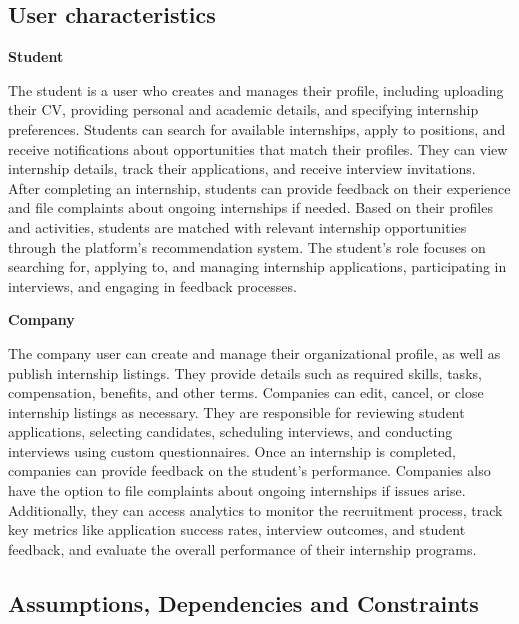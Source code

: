 \subsection{User characteristics}

\textbf{Student}

The student is a user who creates and manages their profile, including uploading their CV, providing personal and academic details, and specifying internship preferences. Students can search for available internships, apply to positions, and receive notifications about opportunities that match their profiles. They can view internship details, track their applications, and receive interview invitations. After completing an internship, students can provide feedback on their experience and file complaints about ongoing internships if needed. Based on their profiles and activities, students are matched with relevant internship opportunities through the platform’s recommendation system. The student’s role focuses on searching for, applying to, and managing internship applications, participating in interviews, and engaging in feedback processes.

\textbf{Company}

The company user can create and manage their organizational profile, as well as publish internship listings. They provide details such as required skills, tasks, compensation, benefits, and other terms. Companies can edit, cancel, or close internship listings as necessary. They are responsible for reviewing student applications, selecting candidates, scheduling interviews, and conducting interviews using custom questionnaires. Once an internship is completed, companies can provide feedback on the student’s performance. Companies also have the option to file complaints about ongoing internships if issues arise. Additionally, they can access analytics to monitor the recruitment process, track key metrics like application success rates, interview outcomes, and student feedback, and evaluate the overall performance of their internship programs.
\subsection{Assumptions, Dependencies and Constraints}
